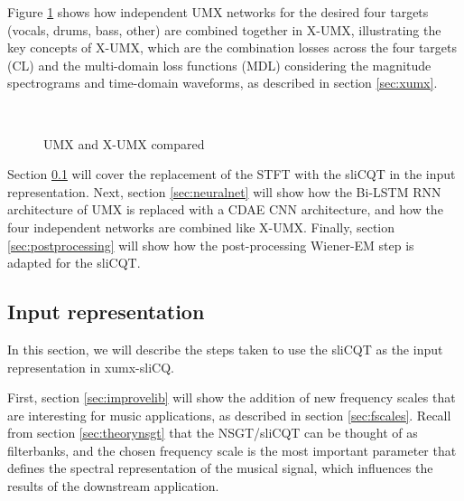 \documentclass[report.tex]{subfiles}
\begin{document}
Figure \ref{fig:xumxcl} shows how independent UMX networks for the desired four targets (vocals, drums, bass, other) are combined together in X-UMX, illustrating the key concepts of X-UMX, which are the combination losses across the four targets (CL) and the multi-domain loss functions (MDL) considering the magnitude spectrograms and time-domain waveforms, as described in section \ref{sec:xumx}.

\begin{figure}[ht]
	\centering
	\\
	\caption{UMX and X-UMX compared}
	\label{fig:xumxcl}
\end{figure}

Section \ref{sec:inputrepresentation} will cover the replacement of the STFT with the sliCQT in the input representation. Next, section \ref{sec:neuralnet} will show how the Bi-LSTM RNN architecture of UMX is replaced with a CDAE CNN architecture, and how the four independent networks are combined like X-UMX. Finally, section \ref{sec:postprocessing} will show how the post-processing Wiener-EM step is adapted for the sliCQT.

\subsection{Input representation}
\label{sec:inputrepresentation}

In this section, we will describe the steps taken to use the sliCQT as the input representation in xumx-sliCQ.

First, section \ref{sec:improvelib} will show the addition of new frequency scales that are interesting for music applications, as described in section \ref{sec:fscales}. Recall from section \ref{sec:theorynsgt} that the NSGT/sliCQT can be thought of as filterbanks, and the chosen frequency scale is the most important parameter that defines the spectral representation of the musical signal, which influences the results of the downstream application.
\end{document}
